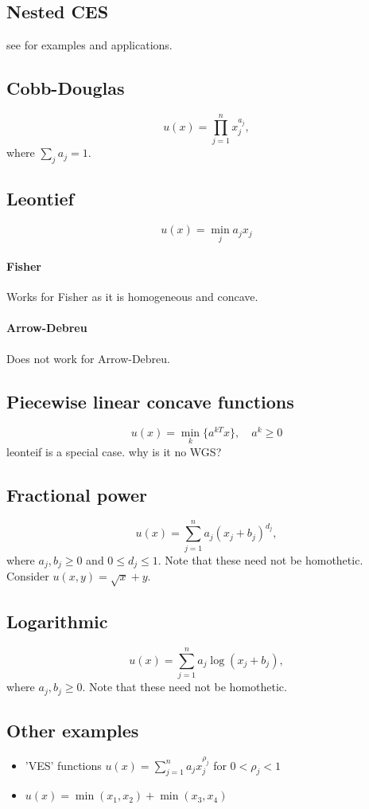 \documentclass{article}
\begin{document}
\subsection{Nested CES}
see \cite{shoven1992applying} for examples and applications.  

\subsection{Cobb-Douglas}
\[
u(x) = \prod_{j=1}^{n} x_j^{a_j},
\]
where $\sum_j a_j = 1$.

\subsection{Leontief}
\[
u(x) = \min_j a_j x_j
\]

\paragraph{Fisher}
Works for Fisher as it is homogeneous and concave.

\paragraph{Arrow-Debreu}
Does not work for Arrow-Debreu.

\subsection{Piecewise linear concave functions}
\[
u(x) = \min_k\lbrace a^{kT}x \rbrace,\quad a^k \geq 0
\]
leonteif is a special case. why is it no WGS?

\subsection{Fractional power}
 \[
 u(x) = \sum_{j=1}^n a_j (x_j+ b_j)^{d_j},
 \]
 where $a_j, b_j \geq 0$ and $0 \leq d_j \leq 1$.
 Note that these need not be homothetic. Consider $u(x,y) = \sqrt{x} + y$.

\subsection{Logarithmic}
\[
u(x) = \sum_{j=1}^n a_j \log(x_j+ b_j),
\]
where $a_j, b_j \geq 0$.  Note that these need not be homothetic.

\subsection{Other examples}
\begin{itemize}
\item 'VES' functions  $u(x) = \sum_{j=1}^{n} a_j x_j^{\rho_j}$ for $0 < \rho_j < 1$
\item $u(x) = \min(x_1,x_2) + \min(x_3,x_4)$
\end{itemize}
\end{document}
